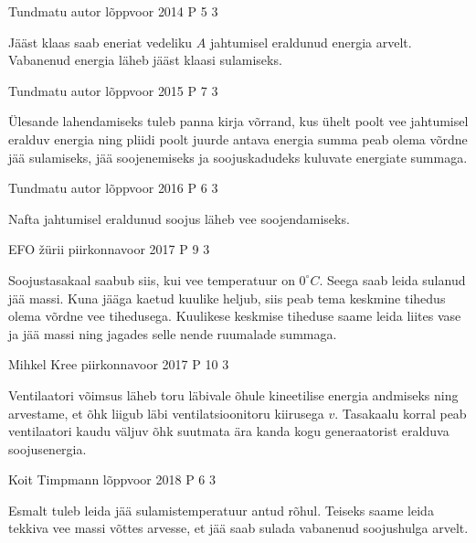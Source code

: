\documentclass[11pt]{article}
\begin{document}
{%
{Tundmatu autor} %
{lõppvoor} %
{2014} %
{P 5} %
{3} %
{

\ifHint
Jääst klaas saab eneriat vedeliku $A$ jahtumisel eraldunud energia arvelt. Vabanenud energia läheb jääst klaasi sulamiseks.
\fi
}

{Tundmatu autor} %
{lõppvoor} %
{2015} %
{P 7} %
{3} %
{

\ifHint
Ülesande lahendamiseks tuleb panna kirja võrrand, kus ühelt poolt vee jahtumisel eralduv energia ning pliidi poolt juurde antava energia summa peab olema võrdne jää sulamiseks, jää soojenemiseks ja soojuskadudeks kuluvate energiate summaga.
\fi
}

{Tundmatu autor} %
{lõppvoor} %
{2016} %
{P 6} %
{3} %
{

\ifHint
Nafta jahtumisel eraldunud soojus läheb vee soojendamiseks.
\fi
}

{EFO žürii} %
{piirkonnavoor} %
{2017} %
{P 9} %
{3} %
{

\ifHint
Soojustasakaal saabub siis, kui vee temperatuur on $0^{\circ}C$. Seega saab leida sulanud jää massi. Kuna jääga kaetud kuulike heljub, siis peab tema keskmine tihedus olema võrdne vee tihedusega. Kuulikese keskmise tiheduse saame leida liites vase ja jää massi ning jagades selle nende ruumalade summaga. 
\fi
}

{Mihkel Kree} %
{piirkonnavoor} %
{2017} %
{P 10} %
{3} %
{

\ifHint
Ventilaatori võimsus läheb toru läbivale õhule kineetilise energia andmiseks ning arvestame, et õhk liigub läbi ventilatsioonitoru kiirusega $v$. Tasakaalu korral peab ventilaatori kaudu väljuv õhk suutmata ära kanda kogu generaatorist eralduva soojusenergia.
\fi
}

{Koit Timpmann} %
{lõppvoor} %
{2018} %
{P 6} %
{3} %
{

\ifHint
Esmalt tuleb leida jää sulamistemperatuur antud rõhul. Teiseks saame leida tekkiva vee massi võttes arvesse, et jää saab sulada vabanenud soojushulga arvelt.
\fi
}

}
\end{document}
